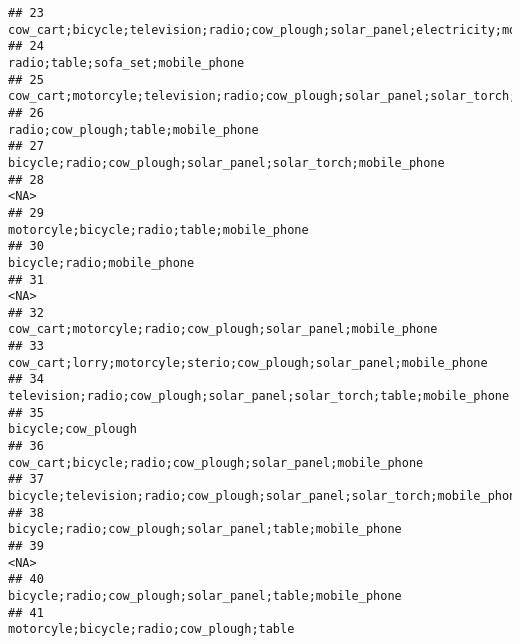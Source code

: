 \documentclass[
]{article}
\begin{document}
\begin{verbatim}
## 23                                                         cow_cart;bicycle;television;radio;cow_plough;solar_panel;electricity;mobile_phone
## 24                                                                                                         radio;table;sofa_set;mobile_phone
## 25                                        cow_cart;motorcyle;television;radio;cow_plough;solar_panel;solar_torch;table;sofa_set;mobile_phone
## 26                                                                                                       radio;cow_plough;table;mobile_phone
## 27                                                                             bicycle;radio;cow_plough;solar_panel;solar_torch;mobile_phone
## 28                                                                                                                                      <NA>
## 29                                                                                                motorcyle;bicycle;radio;table;mobile_phone
## 30                                                                                                                bicycle;radio;mobile_phone
## 31                                                                                                                                      <NA>
## 32                                                                              cow_cart;motorcyle;radio;cow_plough;solar_panel;mobile_phone
## 33                                                                       cow_cart;lorry;motorcyle;sterio;cow_plough;solar_panel;mobile_phone
## 34                                                                    television;radio;cow_plough;solar_panel;solar_torch;table;mobile_phone
## 35                                                                                                                        bicycle;cow_plough
## 36                                                                                cow_cart;bicycle;radio;cow_plough;solar_panel;mobile_phone
## 37                                                                  bicycle;television;radio;cow_plough;solar_panel;solar_torch;mobile_phone
## 38                                                                                   bicycle;radio;cow_plough;solar_panel;table;mobile_phone
## 39                                                                                                                                      <NA>
## 40                                                                                   bicycle;radio;cow_plough;solar_panel;table;mobile_phone
## 41                                                                                                  motorcyle;bicycle;radio;cow_plough;table

\end{verbatim}
\end{document}
